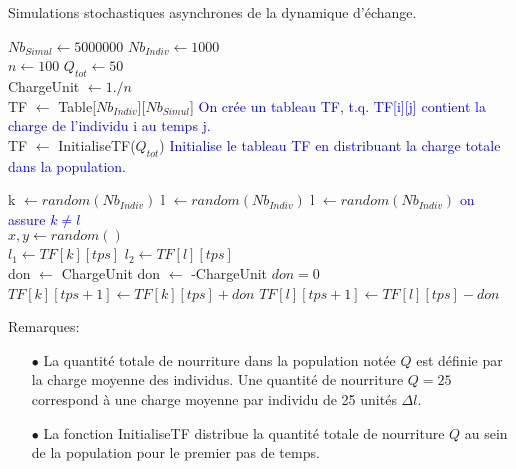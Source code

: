 \clearpage

\begin{algorithm}
\caption{Simulations stochastiques asynchrones de la dynamique d'échange.}
\begin{algorithmic}

\State $Nb_{Simul} \gets 5 000 000$
\State $Nb_{Indiv} \gets 1000$\\

\State $n \gets 100$
\State $Q_{tot} \gets 50$\\

\State ChargeUnit $\gets 1./n$\\


\State TF $\gets$ Table[$Nb_{Indiv}$][$Nb_{Simul}$]
\State \textcolor{blue}{On crée un tableau TF, t.q. TF[i][j] contient la charge de l'individu i au temps j.}\\
\State TF $\gets$ InitialiseTF($Q_{tot}$)
\State \textcolor{blue}{Initialise le tableau TF en distribuant la charge totale dans la population.}\\

	
	\State k $\gets random(Nb_{Indiv})$
	\State l $\gets random(Nb_{Indiv})$
		\State l $\gets random(Nb_{Indiv})$
	\EndWhile
	\State \textcolor{blue}{on assure $k \neq l$}\\
		
	\State $x,y \gets random()$\\
		
	\State $l_1 \gets TF[k][tps]$
	\State $l_2 \gets TF[l][tps]$\\
		
		\State don $\gets$ ChargeUnit 
		\State don $\gets$ -ChargeUnit 
	\Else
		\State $don=0$
	\EndIf \\
		
	\State $TF[k][tps+1] \gets TF[k][tps]+don$
    \State $TF[l][tps+1] \gets TF[l][tps]-don$\\
\EndFor



\end{algorithmic}
\end{algorithm}


Remarques:
\begin{itemize}
\item[$\bullet$]La quantité totale de nourriture dans la population notée $Q$ est définie par la charge moyenne des individus. Une quantité de nourriture $Q=25$ correspond à une charge moyenne par individu de 25 unités $\Delta l$.
\item[$\bullet$]La fonction InitialiseTF distribue la quantité totale de nourriture $Q$ au sein de la population pour le premier pas de temps.
\end{itemize}

